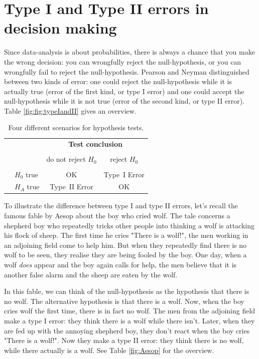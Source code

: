 \documentclass[]{book}\usepackage[]{graphicx}\usepackage[]{color}
\begin{document}
\section{Type I and Type II errors in decision making}


Since data-analysis is about probabilities, there is always a chance that you make the wrong decision: you can wrongfully reject the null-hypothesis, or you can wrongfully fail to reject the null-hypothesis. Pearson and Neyman distinguished between two kinds of error: one could reject the null-hypothesis while it is actually true (error of the first kind, or type I error) and one could accept the null-hypothesis while it is not true (error of the second kind, or type II error). Table \ref{fig:fig:typeIandII} gives an overview.


\begin{table}[ht]
\centering
\begin{tabular}{l l c c}
& & \multicolumn{2}{c}{\textbf{Test conclusion}} \\
  \cline{3-4}
\vspace{-3.7mm} \\
& & do not reject $H_0$ &  reject $H_0$\\
  \cline{2-4}
\vspace{-3.7mm} \\
& $H_0$ true & OK &  Type~I Error \\
\raisebox{1.5ex}{\textbf{Truth}} & $H_A$ true & Type~II Error & OK \\
  \cline{2-4}
\end{tabular}
\caption{Four different scenarios for hypothesis tests.}
\label{fig:typeIandII}
\end{table}

To illustrate the difference between type I and type II errors, let's recall the famous fable by Aesop about the boy who cried wolf. The tale concerns a shepherd boy who repeatedly tricks other people into thinking a wolf is attacking his flock of sheep. The first time he cries "There is a wolf!", the men working in an adjoining field come to help him. But when they repeatedly find there is no wolf to be seen, they realise they are being fooled by the boy. One day, when a wolf \textit{does} appear and the boy again calls for help, the men believe that it is another false alarm and the sheep are eaten by the wolf.

In this fable, we can think of the null-hypothesis as the hypothesis that there is no wolf. The alternative hypothesis is that there is a wolf. Now, when the boy cries wolf the first time, there is in fact no wolf. The men from the adjoining field make a type I error: they think there is a wolf while there isn't. Later, when they are fed up with the annoying shepherd boy, they don't react when the boy cries "There is a wolf!". Now they make a type II error: they think there is no wolf, while there actually is a wolf. See Table \ref{fig:Aesop} for the overview.
\end{document}

